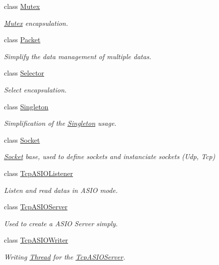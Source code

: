 \begin{DoxyCompactItemize}
class \hyperlink{classmognetwork_1_1_mutex}{Mutex}
\begin{DoxyCompactList}\small\item\em \hyperlink{classmognetwork_1_1_mutex}{Mutex} encapsulation. \end{DoxyCompactList}\item 
class \hyperlink{classmognetwork_1_1_packet}{Packet}
\begin{DoxyCompactList}\small\item\em Simplify the data management of multiple datas. \end{DoxyCompactList}\item 
class \hyperlink{classmognetwork_1_1_selector}{Selector}
\begin{DoxyCompactList}\small\item\em Select encapsulation. \end{DoxyCompactList}\item 
class \hyperlink{classmognetwork_1_1_singleton}{Singleton}
\begin{DoxyCompactList}\small\item\em Simplification of the \hyperlink{classmognetwork_1_1_singleton}{Singleton} usage. \end{DoxyCompactList}\item 
class \hyperlink{classmognetwork_1_1_socket}{Socket}
\begin{DoxyCompactList}\small\item\em \hyperlink{classmognetwork_1_1_socket}{Socket} base, used to define sockets and instanciate sockets (Udp, Tcp) \end{DoxyCompactList}\item 
class \hyperlink{classmognetwork_1_1_tcp_a_s_i_o_listener}{Tcp\-A\-S\-I\-O\-Listener}
\begin{DoxyCompactList}\small\item\em Listen and read datas in A\-S\-I\-O mode. \end{DoxyCompactList}\item 
class \hyperlink{classmognetwork_1_1_tcp_a_s_i_o_server}{Tcp\-A\-S\-I\-O\-Server}
\begin{DoxyCompactList}\small\item\em Used to create a A\-S\-I\-O Server simply. \end{DoxyCompactList}\item 
class \hyperlink{classmognetwork_1_1_tcp_a_s_i_o_writer}{Tcp\-A\-S\-I\-O\-Writer}
\begin{DoxyCompactList}\small\item\em Writing \hyperlink{classmognetwork_1_1_thread}{Thread} for the \hyperlink{classmognetwork_1_1_tcp_a_s_i_o_server}{Tcp\-A\-S\-I\-O\-Server}. \end{DoxyCompactList}\item 

\end{DoxyCompactItemize}
